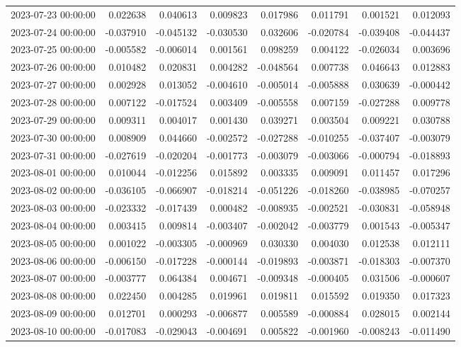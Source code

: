 \begin{tabular}{lrrrrrrr}
2023-07-23 00:00:00 & 0.022638 & 0.040613 & 0.009823 & 0.017986 & 0.011791 & 0.001521 & 0.012093 \\
2023-07-24 00:00:00 & -0.037910 & -0.045132 & -0.030530 & 0.032606 & -0.020784 & -0.039408 & -0.044437 \\
2023-07-25 00:00:00 & -0.005582 & -0.006014 & 0.001561 & 0.098259 & 0.004122 & -0.026034 & 0.003696 \\
2023-07-26 00:00:00 & 0.010482 & 0.020831 & 0.004282 & -0.048564 & 0.007738 & 0.046643 & 0.012883 \\
2023-07-27 00:00:00 & 0.002928 & 0.013052 & -0.004610 & -0.005014 & -0.005888 & 0.030639 & -0.000442 \\
2023-07-28 00:00:00 & 0.007122 & -0.017524 & 0.003409 & -0.005558 & 0.007159 & -0.027288 & 0.009778 \\
2023-07-29 00:00:00 & 0.009311 & 0.004017 & 0.001430 & 0.039271 & 0.003504 & 0.009221 & 0.030788 \\
2023-07-30 00:00:00 & 0.008909 & 0.044660 & -0.002572 & -0.027288 & -0.010255 & -0.037407 & -0.003079 \\
2023-07-31 00:00:00 & -0.027619 & -0.020204 & -0.001773 & -0.003079 & -0.003066 & -0.000794 & -0.018893 \\
2023-08-01 00:00:00 & 0.010044 & -0.012256 & 0.015892 & 0.003335 & 0.009091 & 0.011457 & 0.017296 \\
2023-08-02 00:00:00 & -0.036105 & -0.066907 & -0.018214 & -0.051226 & -0.018260 & -0.038985 & -0.070257 \\
2023-08-03 00:00:00 & -0.023332 & -0.017439 & 0.000482 & -0.008935 & -0.002521 & -0.030831 & -0.058948 \\
2023-08-04 00:00:00 & 0.003415 & 0.009814 & -0.003407 & -0.002042 & -0.003779 & 0.001543 & -0.005347 \\
2023-08-05 00:00:00 & 0.001022 & -0.003305 & -0.000969 & 0.030330 & 0.004030 & 0.012538 & 0.012111 \\
2023-08-06 00:00:00 & -0.006150 & -0.017228 & -0.000144 & -0.019893 & -0.003871 & -0.018303 & -0.007370 \\
2023-08-07 00:00:00 & -0.003777 & 0.064384 & 0.004671 & -0.009348 & -0.000405 & 0.031506 & -0.000607 \\
2023-08-08 00:00:00 & 0.022450 & 0.004285 & 0.019961 & 0.019811 & 0.015592 & 0.019350 & 0.017323 \\
2023-08-09 00:00:00 & 0.012701 & 0.000293 & -0.006877 & 0.005589 & -0.000884 & 0.028015 & 0.002144 \\
2023-08-10 00:00:00 & -0.017083 & -0.029043 & -0.004691 & 0.005822 & -0.001960 & -0.008243 & -0.011490 \\

\end{tabular}
